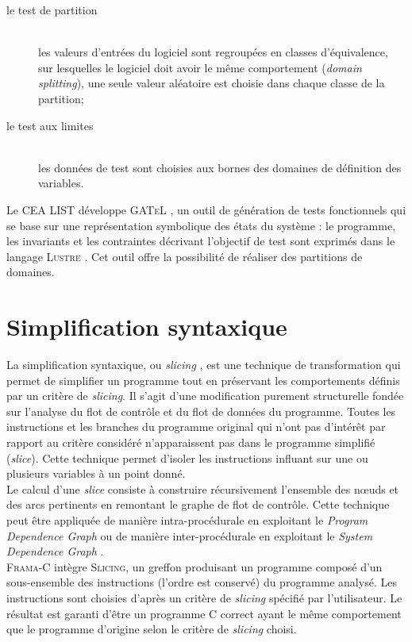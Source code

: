 \begin{description}
\item[le test de partition] \hfill \\
les valeurs d’entrées du logiciel sont regroupées en classes d’équivalence, sur
lesquelles le logiciel doit avoir le même comportement ({\em domain splitting}),
une seule valeur aléatoire est choisie dans chaque classe de la partition;
\item[le test aux limites] \hfill \\
les données de test sont choisies aux bornes des domaines de définition des
variables.
\end{description}

Le CEA LIST développe \textsc{GATeL} \cite{GATEL}, un outil de génération de
tests fonctionnels qui se base sur une représentation symbolique des états du
système : le programme, les invariants et les contraintes décrivant l'objectif
de test sont exprimés dans le langage \textsc{Lustre} \cite{Lustre}. Cet outil
offre la possibilité de réaliser des partitions de domaines.


\section{Simplification syntaxique}

La simplification syntaxique, ou {\em slicing} \cite{slicing}, est une technique
de transformation qui permet de simplifier un programme tout en préservant les
comportements définis par un critère de {\em slicing}. Il s’agit d’une
modification purement structurelle fondée sur l'analyse du flot de contrôle et
du flot de données du programme. Toutes les instructions et les branches du
programme original qui n’ont pas d’intérêt par rapport au critère considéré
n’apparaissent pas dans le programme simplifié ({\em slice}). Cette technique
permet d’isoler les instructions influant sur une ou plusieurs variables à un
point donné.\\

Le calcul d’une {\em slice} consiste à construire récursivement l’ensemble des
n\oe{}uds et des arcs pertinents en remontant le graphe de flot de contrôle.
Cette technique peut être appliquée de manière intra-procédurale en exploitant
le {\em Program Dependence Graph} \cite{PDG} ou de manière inter-procédurale en
exploitant le {\em System Dependence Graph} \cite{SDG}.\\

\textsc{Frama-C} intègre \textsc{Slicing}, un greffon produisant un programme
composé d'un sous-ensemble des instructions (l'ordre est conservé) du programme
analysé. Les instructions sont choisies d'après un critère de {\em slicing}
spécifié par l'utilisateur. Le résultat est garanti d'être un programme C
correct ayant le même comportement que le programme d'origine selon le critère
de {\em slicing} choisi.


